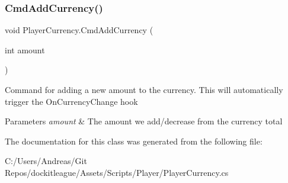 \subsubsection{\texorpdfstring{Cmd\+Add\+Currency()}{CmdAddCurrency()}}
{\footnotesize\ttfamily void Player\+Currency.\+Cmd\+Add\+Currency (\begin{DoxyParamCaption}\item[{int}]{amount }\end{DoxyParamCaption})}



Command for adding a new amount to the currency. This will automatically trigger the On\+Currency\+Change hook 


\begin{DoxyParams}{Parameters}
{\em amount} & The amount we add/decrease from the currency total\\
\hline
\end{DoxyParams}


The documentation for this class was generated from the following file\+:\begin{DoxyCompactItemize}
\item 
C\+:/\+Users/\+Andreas/\+Git Repos/dockitleague/\+Assets/\+Scripts/\+Player/Player\+Currency.\+cs\end{DoxyCompactItemize}
